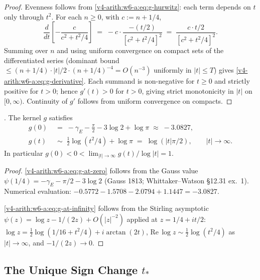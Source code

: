 \begin{proof}
Evenness follows from \eqref{v4-arith:w6-a:eq:g-hurwitz}: each term
depends on \(t\) only through \(t^{2}\). For each \(n\geq 0\), with
\(c:=n+1/4\),
\[
\frac{d}{dt}\!\left[-\frac{c}{c^{2}+t^{2}/4}\right]
\;=\;-c\cdot\frac{-(t/2)}{[c^{2}+t^{2}/4]^{2}}
\;=\;\frac{c\cdot t/2}{[c^{2}+t^{2}/4]^{2}}.
\]
Summing over \(n\) and using uniform convergence on compact sets of
the differentiated series
(dominant bound \(\leq(n+1/4)\cdot|t|/2\cdot(n+1/4)^{-4}=O(n^{-3})\)
uniformly in \(|t|\leq T\)) gives
\eqref{v4-arith:w6-a:eq:g-derivative}. Each summand is non-negative
for \(t\geq 0\) and strictly positive for \(t>0\); hence \(g'(t)>0\) for
\(t>0\), giving strict monotonicity in \(|t|\) on \([0,\infty)\).
Continuity of \(g'\) follows from uniform convergence on compacts.
\end{proof}

\begin{proposition}
\label{v4-arith:w6-a:prop:g-boundary}
\ClaimStatusProvedHere. The kernel \(g\) satisfies
\begin{align}
\label{v4-arith:w6-a:eq:g-at-zero}
g(0)&\;=\;-\gamma_{E}-\frac{\pi}{2}-3\log 2+\log\pi\;\approx\;-3.0827,\\
\label{v4-arith:w6-a:eq:g-at-infinity}
g(t)&\;\sim\;\tfrac{1}{2}\log(t^{2}/4)+\log\pi\;=\;\log(|t|\pi/2),\qquad|t|\to\infty.
\end{align}
In particular \(g(0)<0<\lim_{|t|\to\infty}g(t)/\log|t|=1\).
\end{proposition}

\begin{proof}
\eqref{v4-arith:w6-a:eq:g-at-zero} follows from the Gauss value
\(\psi(1/4)=-\gamma_{E}-\pi/2-3\log 2\) (Gauss 1813; Whittaker--Watson
\S12.31 ex.~1). Numerical evaluation:
\(-0.5772-1.5708-2.0794+1.1447=-3.0827\).

\eqref{v4-arith:w6-a:eq:g-at-infinity} follows from the Stirling
asymptotic \(\psi(z)=\log z-1/(2z)+O(|z|^{-2})\) applied at
\(z=1/4+it/2\): \(\log z=\tfrac{1}{2}\log(1/16+t^{2}/4)+i\arctan(2t)\),
\(\mathrm{Re}\,\log z\sim\tfrac{1}{2}\log(t^{2}/4)\) as \(|t|\to\infty\),
and \(-1/(2z)\to 0\).
\end{proof}

\subsection{The Unique Sign Change \(t_{\ast}\)}
\label{v4-arith:w6-a:digamma-kernel:sign-change}


